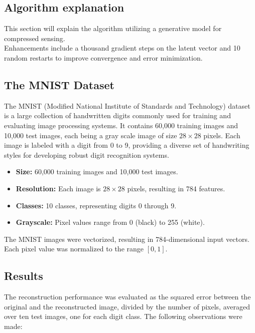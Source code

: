 \subsection{Algorithm explanation}

This section will explain the algorithm utilizing a generative model for compressed sensing.
\\
Enhancements include a thousand gradient steps on the latent vector and 10 random restarts to improve convergence and error minimization.



\subsection{The MNIST Dataset}

The MNIST (Modified National Institute of Standards and Technology) dataset is a large collection of handwritten digits commonly used for training and evaluating image processing systems. It contains 60,000 training images and 10,000 test images, each being a gray scale image of size \( 28 \times 28 \) pixels. Each image is labeled with a digit from 0 to 9, providing a diverse set of handwriting styles for developing robust digit recognition systems.
\begin{itemize}
    \item \textbf{Size:} 60,000 training images and 10,000 test images.
    \item \textbf{Resolution:} Each image is \( 28 \times 28 \) pixels, resulting in 784 features.
    \item \textbf{Classes:} 10 classes, representing digits 0 through 9.
    \item \textbf{Grayscale:} Pixel values range from 0 (black) to 255 (white).
\end{itemize}
The MNIST images were vectorized, resulting in 784-dimensional input vectors. Each pixel value was normalized to the range $[0, 1]$.



\subsection{Results}

The reconstruction performance was evaluated as the squared error between the original and the reconstructed image, divided by the number of pixels, averaged over ten test images, one for each digit class. The following observations were made:

